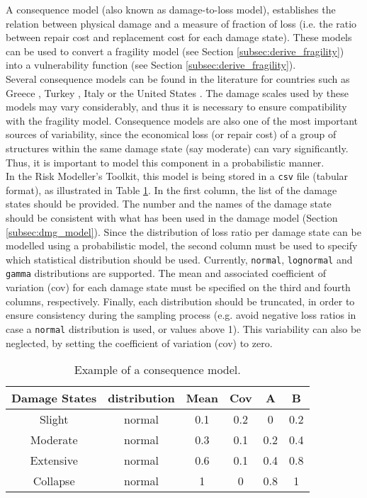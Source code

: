 A consequence model (also known as damage-to-loss model), establishes the relation between physical damage and a measure of fraction of loss (i.e. the ratio between repair cost and replacement cost for each damage state). These models can be used to convert a fragility model (see Section \ref{subsec:derive_fragility}) into a vulnerability function (see Section \ref{subsec:derive_fragility}). \\

Several consequence models can be found in the literature for countries such as Greece \citep{KapposEtAl2006}, Turkey \citep{BalEtAl2010}, Italy \citep{DiPasqualeandGoretti2001} or the United States \citep{FEMA2003}. The damage scales used by these models may vary considerably, and thus it is necessary to ensure compatibility with the fragility model. Consequence models are also one of the most important sources of variability, since the economical loss (or repair cost) of a group of structures within the same damage state (say moderate) can vary significantly. Thus, it is important to model this component in a probabilistic manner.\\

In the Risk Modeller's Toolkit, this model is being stored in a \verb=csv= file (tabular format), as illustrated in Table \ref{table:cons_model}. In the first column, the list of the damage states should be provided. The number and the names of the damage state should be consistent with what has been used in the damage model (Section \ref{subsec:dmg_model}). Since the distribution of loss ratio per damage state can be modelled using a probabilistic model, the second column must be used to specify which statistical distribution should be used. Currently, \verb=normal=, \verb=lognormal= and \verb=gamma= distributions are supported. The mean and associated coefficient of variation (cov) for each damage state must be specified on the third and fourth columns, respectively. Finally, each distribution should be truncated, in order to ensure consistency during the sampling process (e.g. avoid negative loss ratios in case a \verb=normal= distribution is used, or values above 1). This variability can also be neglected, by setting the coefficient of variation (cov) to zero.

\begin {table}[htb]
\caption{Example of a consequence model.}
\label{table:cons_model}
\begin{center}
  \begin{tabular}{ | c | c | c | c | c | c |}
  \hline
Damage States & distribution & Mean & Cov & A & B\\ \hline
Slight & normal & 0.1 & 0.2 & 0 & 0.2\\ \hline
Moderate & normal & 0.3 & 0.1 & 0.2 & 0.4\\ \hline
Extensive & normal & 0.6 & 0.1 & 0.4 & 0.8\\ \hline
Collapse & normal & 1 & 0 & 0.8 & 1\\ \hline
  \end{tabular}
\end{center}
\end{table}


